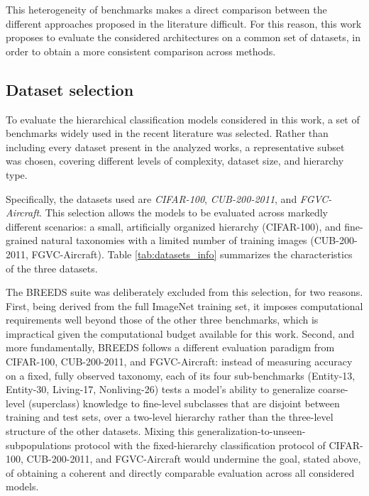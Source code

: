 This heterogeneity of benchmarks makes a direct comparison between the different approaches proposed in the literature difficult. For this reason, this work proposes to evaluate the considered architectures on a common set of datasets, in order to obtain a more consistent comparison across methods.


\subsection{Dataset selection}
\label{sec:dataset_selection}

To evaluate the hierarchical classification models considered in this work, a set of benchmarks widely used in the recent literature was selected. Rather than including every dataset present in the analyzed works, a representative subset was chosen, covering different levels of complexity, dataset size, and hierarchy type.

Specifically, the datasets used are \textit{CIFAR-100}, \textit{CUB-200-2011}, and \textit{FGVC-Aircraft}. This selection allows the models to be evaluated across markedly different scenarios: a small, artificially organized hierarchy (CIFAR-100), and fine-grained natural taxonomies with a limited number of training images (CUB-200-2011, FGVC-Aircraft). Table \ref{tab:datasets_info} summarizes the characteristics of the three datasets.

The BREEDS suite was deliberately excluded from this selection, for two reasons. First, being derived from the full ImageNet training set, it imposes computational requirements well beyond those of the other three benchmarks, which is impractical given the computational budget available for this work. Second, and more fundamentally, BREEDS follows a different evaluation paradigm from CIFAR-100, CUB-200-2011, and FGVC-Aircraft: instead of measuring accuracy on a fixed, fully observed taxonomy, each of its four sub-benchmarks (Entity-13, Entity-30, Living-17, Nonliving-26) tests a model's ability to generalize coarse-level (superclass) knowledge to fine-level subclasses that are disjoint between training and test sets, over a two-level hierarchy rather than the three-level structure of the other datasets. Mixing this generalization-to-unseen-subpopulations protocol with the fixed-hierarchy classification protocol of CIFAR-100, CUB-200-2011, and FGVC-Aircraft would undermine the goal, stated above, of obtaining a coherent and directly comparable evaluation across all considered models.

